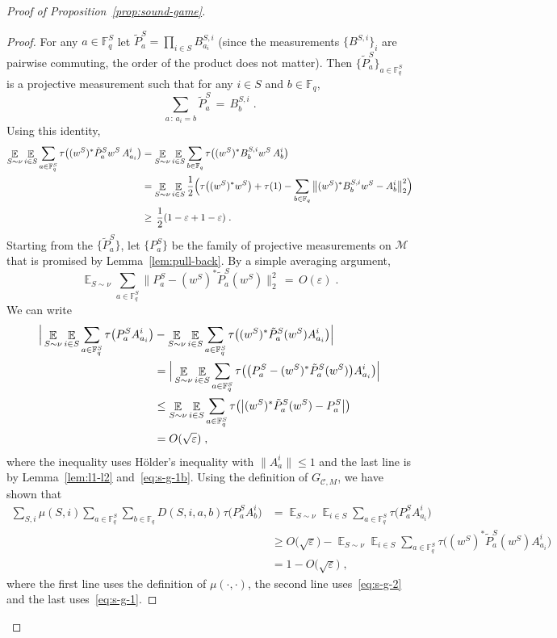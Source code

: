 \documentclass[11pt]{article}
\theoremstyle{definition}
\newcommand{\code}{\mathcal{C}}
\DeclareMathOperator*{\Expectation}{\mathbb{E}}
\newcommand{\Es}[1]{\Expectation_{#1}}
\newcommand{\F}{\ensuremath{\mathbb{F}}}
\newcommand{\mM}{\ensuremath{\mathcal{M}}}
\newcommand{\eps}{\varepsilon}
\begin{document}
\begin{proof}[Proof of Proposition~\ref{prop:sound-game}]
\begin{proof}
For any $a\in\F^S_q$ let $\tilde{P}^S_a = \prod_{i\in S} B^{S,i}_{a_i}$ (since the measurements $\{B^{S,i}\}_i$ are pairwise commuting, the order of the product does not matter). Then $\{\tilde{P}^S_a\}_{a\in\F_q^S}$ is a projective measurement such that for any $i\in S$ and $b\in \F_q$, 
\[ \sum_{a\,:\, a_i=b} \tilde{P}^S_a \,=\, B^{S,i}_b\;.\]
Using this identity,
\begin{align}
\Es{S\sim \nu} \Es{i\in S} \sum_{a\in \F_q^S} \tau\big(  (w^S)^* \tilde{P}^S_a w^S \, A^i_{a_i}\big) 
&= \Es{S\sim \nu} \Es{i\in S} \sum_{b\in \F_q}\tau\big(  (w^S)^* B^{S,i}_b w^S\, A^i_{b}\big)\notag \\
&= \Es{S\sim \nu} \Es{i\in S} \frac{1}{2}\Big(\tau\big((w^S)^*w^S\big) + \tau(1) - \sum_{b\in \F_q} \big\|  (w^S)^* B^{S,i}_b w^S - A^i_{b}\big\|_2^2\Big) \notag\\
&\geq \,\frac{1}{2}(1-\eps+1-\eps)\;.\label{eq:s-g-1}
\end{align}
Starting from the $\{\tilde{P}^S_a\}$, let $\{P^S_a\}$ be the family of projective measurements on $\mM$ that is promised by Lemma~\ref{lem:pull-back}. By a simple averaging argument,
\begin{equation}\label{eq:s-g-1b}
\Es{S\sim \nu}\sum_{a\in \F_q^S} \big\| P^S_a - (w^S)^* \tilde{P}^S_a (w^S)\big\|_2^2 \,=\, O(\eps)\;. 
\end{equation}
We can write
\begin{align}
\Big|\Es{S\sim \nu} \Es{i\in S} \sum_{a\in \F_q^S} \tau\big( P^S_a A^i_{a_i}\big)
&- \Es{S\sim \nu} \Es{i\in S} \sum_{a\in \F_q^S} \tau\big( (w^S)^* \tilde{P}^S_a (w^S)A^i_{a_i}\big)\Big|\notag\\
&= \Big| \Es{S\sim \nu} \Es{i\in S} \sum_{a\in \F_q^S} \tau\big(\big(P^S_a - (w^S)^* \tilde{P}^S_a (w^S)\big)A^i_{a_i}\big)\Big|\notag\\
&\leq \Es{S\sim \nu} \Es{i\in S} \sum_{a\in \F_q^S} \tau\big(\big|(w^S)^* \tilde{P}^S_a (w^S)-P^S_a\big|\big)\notag\\
&= O(\sqrt{\eps})\;,\label{eq:s-g-2}
\end{align}
where the inequality uses H\"{o}lder's inequality with $\|A^i_a\|\leq 1$ and the last line is by Lemma~\ref{lem:l1-l2} and~\eqref{eq:s-g-1b}.
Using the definition of $G_{\code,M}$, we have shown that
\begin{align*}
 \sum_{S,i} \mu(S,i) \sum_{a\in \F^S_q}\sum_{b\in\F_q} D(S,i,a,b) \tau\big(  P^S_a  A^i_{b}\big)
&=  \Es{S\sim\nu} \Es{i\in S} \sum_{a\in \F^S_q}  \tau\big(  P^S_a  A^i_{a_i}\big)\\
&\geq O\big(\sqrt{\eps}\big) - \Es{S\sim \nu} \Es{i\in S} \sum_{a\in \F_q^S} \tau\big( (w^S)^* \tilde{P}^S_a (w^S)A^i_{a_i}\big)\\
&= 1-O\big(\sqrt{\eps}\big)\;,
\end{align*}
where the first line uses the definition of $\mu(\cdot,\cdot)$, the second line uses~\eqref{eq:s-g-2} and the last uses~\eqref{eq:s-g-1}. 
\end{proof}


\end{proof}
\end{document}
